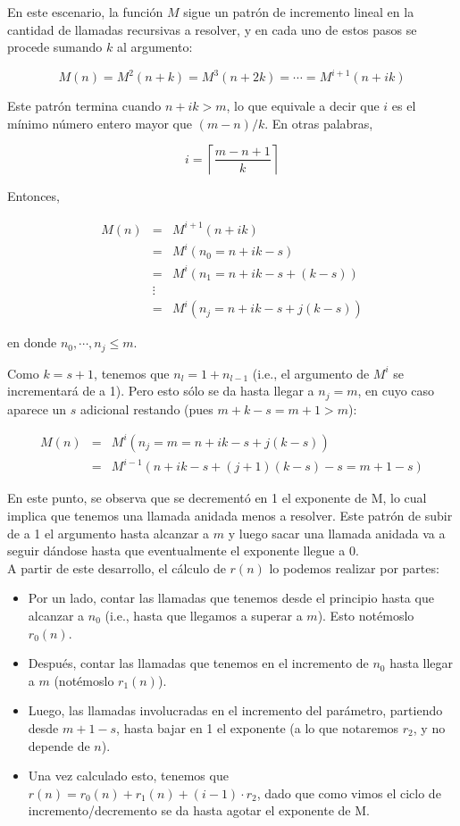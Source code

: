 \documentclass[a4paper,10pt]{article}
\newcommand{\ceil}[1]{\ensuremath{\left\lceil #1 \right\rceil}}
\begin{document}
En este escenario, la funci\'on $M$ sigue un patr\'on de incremento lineal en la cantidad de llamadas recursivas a
resolver, y en cada uno de estos pasos se procede sumando $k$ al argumento:

$$M(n) = M^2(n + k) = M^3(n + 2k) = \cdots = M^{i+1}(n + ik)$$

Este patr\'on termina cuando $n + ik > m$, lo que equivale a decir que $i$ es el m\'inimo n\'umero entero mayor
que $(m - n) / k$. En otras palabras,

$$i = \ceil{\frac{m-n+1}{k}}$$

Entonces,

\begin{eqnarray*}
M(n)  &=& M^{i+1}(n + ik) \\
      &=& M^i(n_0 = n + ik - s) \\
      &=& M^i(n_1 = n + ik - s + (k-s)) \\
      &\vdots& \\
      &=& M^i(n_j = n + ik - s + j(k-s))
\end{eqnarray*}

en donde $n_0,\cdots,n_j \leq m$.

Como $k = s + 1$, tenemos que $n_l = 1 + n_{l-1}$ (i.e., el argumento de $M^i$ se incrementar\'a
de a 1). Pero esto s\'olo se da hasta llegar a $n_j = m$, en cuyo caso aparece un $s$ adicional restando (pues
$m + k - s = m + 1 > m$):

\begin{eqnarray*}
M(n) &=& M^i(n_j = m = n + ik - s + j(k-s)) \\
     &=& M^{i-1}(n + ik - s + (j+1)(k-s) - s = m + 1 - s)
\end{eqnarray*}

En este punto, se observa que se decrement\'o en 1 el exponente de M, lo cual implica que tenemos una llamada
anidada menos a resolver. Este patr\'on de subir de a 1 el argumento hasta alcanzar a $m$ y luego sacar una
llamada anidada va a seguir d\'andose hasta que eventualmente el exponente llegue a 0.\\

A partir de este desarrollo, el c\'alculo de $r(n)$ lo podemos realizar por partes:

\begin{itemize}
  \item Por un lado, contar las llamadas que tenemos desde el principio hasta que alcanzar a $n_0$ (i.e.,
        hasta que llegamos a superar a $m$). Esto not\'emoslo $r_0(n)$.
  \item Despu\'es, contar las llamadas que tenemos en el incremento de $n_0$ hasta llegar a $m$ (not\'emoslo $r_1(n)$).
  \item Luego, las llamadas involucradas en el incremento del par\'ametro, partiendo desde $m + 1 - s$, hasta bajar
        en 1 el exponente (a lo que notaremos $r_2$, y no depende de $n$).
  \item Una vez calculado esto, tenemos que $r(n) = r_0(n) + r_1(n) + (i-1) \cdot r_2$, dado que como vimos el ciclo
        de incremento/decremento se da hasta agotar el exponente de M.
\end{itemize}
\end{document}
